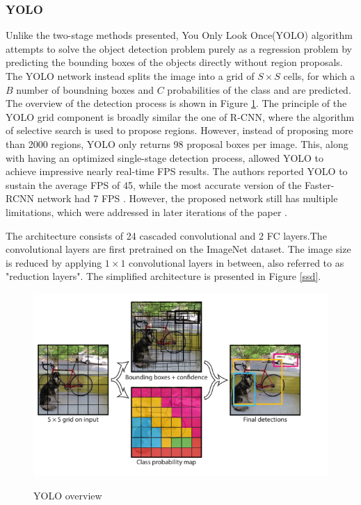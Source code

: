 \documentclass[english, 12pt, a4paper, elec, utf8, a-1b, online]{aaltothesis}
\begin{document}
\subsubsection{YOLO}
\label{yolo_section} 

Unlike the two-stage methods presented, You Only Look Once(YOLO)\cite{Redmon2015a} algorithm attempts to solve the object detection problem purely as a regression problem by predicting the bounding boxes of the objects directly without region proposals. The YOLO network instead splits the image into a grid of $S\times S$ cells, for which a $B$ number of boundning boxes and $C$ probabilities of the class and  are predicted. \cite{Redmon2015a} The overview of the detection process is shown in Figure \ref{yolo}. The principle of the YOLO grid component is broadly similar the one of R-CNN\cite{Girshick2013}, where the algorithm of selective search \cite{Uijlings13} is used to propose regions. However, instead of proposing more than 2000 regions, YOLO only returns 98 proposal boxes per image. This, along with having an optimized single-stage detection process, allowed YOLO to achieve impressive nearly real-time FPS results. The authors reported YOLO to sustain the average FPS of 45, while the most accurate version of the Faster-RCNN network had 7 FPS \cite{Redmon2015a}. However, the proposed network still has multiple limitations, which were addressed in later iterations of the paper \cite{Redmon2018a}\cite{Redmon2016}.

The architecture consists of 24 cascaded convolutional and 2 FC layers.The convolutional layers are first pretrained on the ImageNet dataset\cite{Russakovsky2014}. The image size is reduced by applying $1\times1$ convolutional layers in between, also referred to as "reduction layers". \cite{Redmon2015a} The simplified architecture is presented in Figure \ref{ssd}.

\begin{figure}[htb]
	\begin{center}
		\includegraphics[width=12cm]{./yolo.png}
	\end{center}
	\caption{YOLO overview\cite{Redmon2015a}}
	\begin{center}
		\label{yolo}
	\end{center}
\end{figure}
\FloatBarrier
\end{document}
